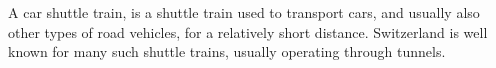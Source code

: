 A car shuttle train, is a shuttle train used to transport cars, and usually also other types of road vehicles, for a relatively short distance.
Switzerland is well known for many such shuttle trains, usually operating through tunnels.